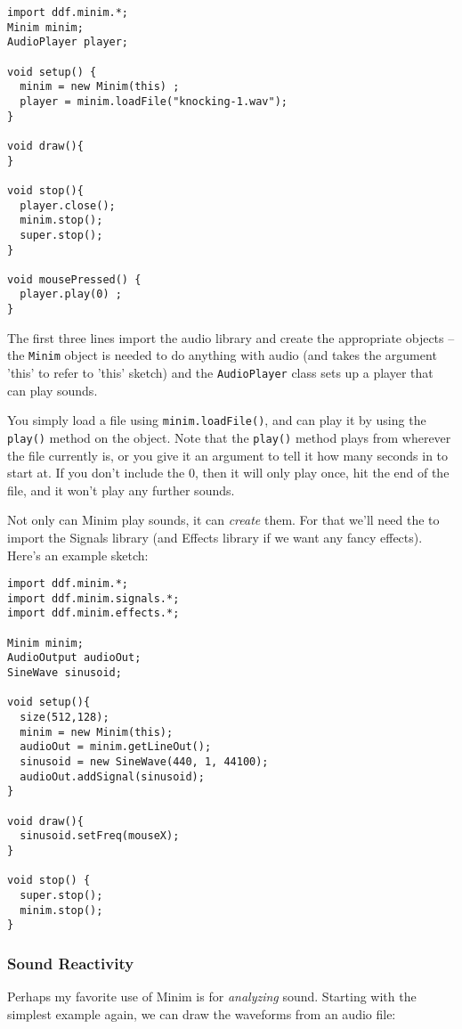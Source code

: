 \begin{verbatim}
import ddf.minim.*;
Minim minim;
AudioPlayer player;

void setup() {
  minim = new Minim(this) ;
  player = minim.loadFile("knocking-1.wav");
}

void draw(){
}

void stop(){
  player.close();
  minim.stop();
  super.stop();
}

void mousePressed() {
  player.play(0) ;
}
\end{verbatim}

The first three lines import the audio library and create the appropriate objects -- the \texttt{Minim} object is needed to do anything with audio (and takes the argument 'this' to refer to 'this' sketch) and the \texttt{AudioPlayer} class sets up a player that can play sounds.

You simply load a file using \texttt{minim.loadFile()}, and can play it by using the \texttt{play()} method on the object.  Note that the \texttt{play()} method plays from wherever the file currently is, or you give it an argument to tell it how many seconds in to start at.  If you don't include the 0, then it will only play once, hit the end of the file, and it won't play any further sounds.

Not only can Minim play sounds, it can \emph{create} them.  For that we'll need the to import the Signals library (and Effects library if we want any fancy effects).  Here's an example sketch:

\begin{verbatim}
import ddf.minim.*;
import ddf.minim.signals.*;
import ddf.minim.effects.*;

Minim minim;
AudioOutput audioOut;
SineWave sinusoid;

void setup(){
  size(512,128);
  minim = new Minim(this);
  audioOut = minim.getLineOut();
  sinusoid = new SineWave(440, 1, 44100);
  audioOut.addSignal(sinusoid);
}

void draw(){
  sinusoid.setFreq(mouseX);
}

void stop() {
  super.stop();
  minim.stop();
}
\end{verbatim}

\subsubsection{Sound Reactivity}
Perhaps my favorite use of Minim is for \emph{analyzing} sound.  Starting with the simplest example again, we can draw the waveforms from an audio file:

